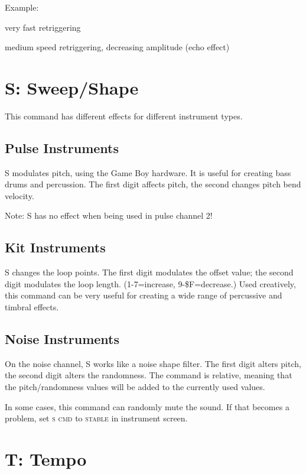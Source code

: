 \begin{description}
\item Example:
\item[R00] very fast retriggering
\item[RF3] medium speed retriggering, decreasing amplitude (echo effect)
\end{description}

\section{S: Sweep/Shape}

This command has different effects for different instrument types.

\subsection{Pulse Instruments}

S modulates pitch, using the Game Boy hardware. It is useful for creating bass drums and percussion. The first digit affects pitch, the second changes pitch bend velocity.

Note: S has no effect when being used in pulse channel 2!

\subsection{Kit Instruments}

S changes the loop points. The first digit modulates the offset value; the second digit modulates the loop length. (1-7=increase, 9-\$F=decrease.) Used creatively, this command can be very useful for creating a wide range of percussive and timbral effects.

\subsection{Noise Instruments}
\label{command-shape-noise}

On the noise channel, S works like a noise shape filter.
The first digit alters pitch, the second digit alters the randomness.
The command is relative, meaning that the pitch/randomness values
will be added to the currently used values.

In some cases, this command can randomly mute the sound. If that becomes a problem, set
\textsc{s cmd} to \textsc{stable} in instrument screen.

\section{T: Tempo}

